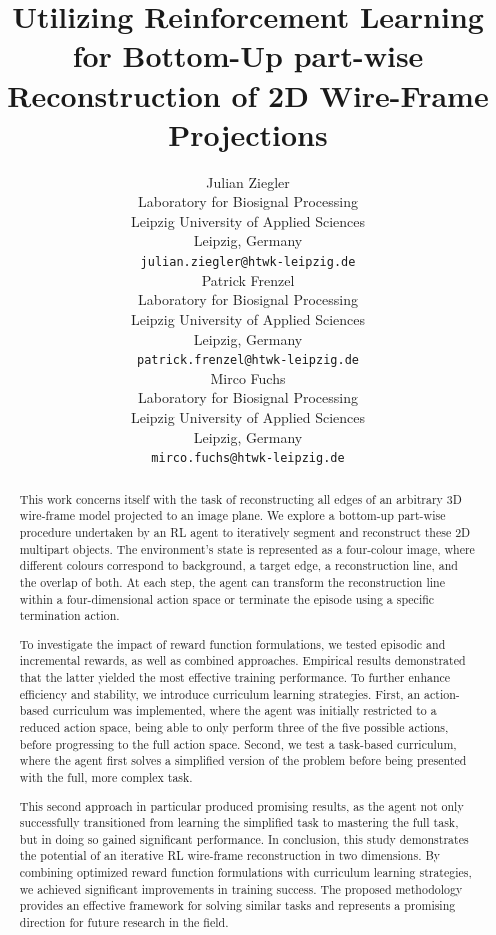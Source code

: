 \documentclass[11pt]{article} %
\title{Utilizing Reinforcement Learning for Bottom-Up part-wise Reconstruction of 2D Wire-Frame Projections}
\author{
Julian Ziegler\\%
Laboratory for Biosignal Processing \\
Leipzig University of Applied Sciences\\
Leipzig, Germany \\
\texttt{julian.ziegler@htwk-leipzig.de} \\
\AND
Patrick Frenzel \\
Laboratory for Biosignal Processing \\
Leipzig University of Applied Sciences\\
Leipzig, Germany \\
\texttt{patrick.frenzel@htwk-leipzig.de} \\
\And
Mirco Fuchs \\
Laboratory for Biosignal Processing \\
Leipzig University of Applied Sciences\\
Leipzig, Germany \\
\texttt{mirco.fuchs@htwk-leipzig.de} \\
}
\begin{document}
\maketitle

\begin{abstract}

This work concerns itself with the task of reconstructing all edges of an arbitrary 3D wire-frame model projected to an image plane. We explore a bottom-up part-wise procedure undertaken by an RL agent to iteratively segment and reconstruct these 2D multipart objects. 
The environment's state is represented as a four-colour image, where different colours correspond to background, a target edge, a reconstruction line, and the overlap of both.
At each step, the agent can transform the reconstruction line within a four-dimensional action space or terminate the episode using a specific termination action.

To investigate the impact of reward function formulations, we tested episodic and incremental rewards, as well as combined approaches.
Empirical results demonstrated that the latter yielded the most effective training performance.
To further enhance efficiency and stability, we introduce curriculum learning strategies.
First, an action-based curriculum was implemented, where the agent was initially restricted to a reduced action space, being able to only perform three of the five possible actions, before progressing to the full action space.
Second, we test a task-based curriculum, where the agent first solves a simplified version of the problem before being presented with the full, more complex task.

This second approach in particular produced promising results, as the agent not only successfully transitioned from learning the simplified task to mastering the full task, but in doing so gained significant performance.
In conclusion, this study demonstrates the potential of an iterative RL wire-frame reconstruction in two dimensions.
By combining optimized reward function formulations with curriculum learning strategies, we achieved significant improvements in training success.
The proposed methodology provides an effective framework for solving similar tasks and represents a promising direction for future research in the field.

\end{abstract}


\startmain
\end{document}
